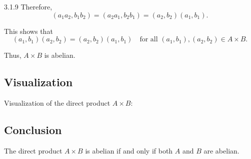 \documentclass[12pt]{amsart}
\theoremstyle{definition}
\numberwithin{equation}{section}
\begin{document}
\begin{exercise}{3.1.9}
    Therefore,
    \[
    (a_1 a_2, b_1 b_2) = (a_2 a_1, b_2 b_1) = (a_2, b_2) (a_1, b_1).
    \]

    This shows that
    \[
    (a_1, b_1) (a_2, b_2) = (a_2, b_2) (a_1, b_1) \quad \text{for all } (a_1, b_1), (a_2, b_2) \in A \times B.
    \]

    Thus, \(A \times B\) is abelian.

    \subsection*{Visualization}

    Visualization of the direct product \(A \times B\):

    \begin{center}
    \end{center}
    
    \subsection*{Conclusion}

    The direct product \(A \times B\) is abelian if and only if both \(A\) and \(B\) are abelian.

\end{exercise}
\newpage
\end{document}
